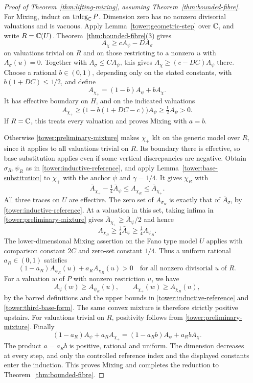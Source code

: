 \begin{proof}[Proof of Theorem~\ref{thm:lifting-mixing}, assuming
Theorem~\ref{thm:bounded-fibre}]
For Mixing, induct on $\operatorname{trdeg}_{\mathbb C}P$.
Dimension zero has no nonzero divisorial valuations and is
vacuous.  Apply Lemma~\ref{tower:geometric-step} over $\mathbb C$, and
write $R=\mathbb C(U)$.  Theorem~\ref{thm:bounded-fibre}(3) gives
\[
 A_\chi\ge cA_\psi-D A_\sigma
\]
on valuations trivial on $R$ and on those restricting to a
nonzero $u$ with $\bar A_\sigma(u)=0$.
Together with $A_\sigma\le C A_\psi$, this gives
$A_\chi\ge(c-DC)A_\psi$ there.
Choose a rational $b\in(0,1)$, depending only on the stated
constants, with $b(1+DC)\le1/2$, and define
\[
 A_{\chi_+}=(1-b)A_\psi+bA_\chi.
\]
It has effective boundary on $H$, and on the indicated valuations
\begin{equation}
\label{tower:preliminary-mixture}
 A_{\chi_+}\ge\bigl(1-b(1+DC-c)\bigr)A_\psi
 \ge\tfrac12 A_\psi>0.
\end{equation}
If $R=\mathbb C$, this treats every valuation and proves Mixing with
$a=b$.

Otherwise \eqref{tower:preliminary-mixture} makes $\chi_+$ klt
on the generic model over $R$, since it applies to all valuations
trivial on $R$.  Its boundary there is effective, so base
substitution applies even if some vertical discrepancies are
negative.  Obtain $\sigma_R,\psi_R$ as in
\eqref{tower:inductive-reference}, and apply
Lemma~\ref{tower:base-substitution} to $\chi_+$ with the anchor
$\psi$ and $\gamma=1/4$.  It gives $\chi_R$ with
\begin{equation}
\label{tower:third-base-form}
 \bar A_{\chi_+}-\tfrac14\bar A_\psi
 \le A_{\chi_R}\le\bar A_{\chi_+}.
\end{equation}
All three traces on $U$ are effective.  The zero set of
$A_{\sigma_R}$ is exactly that of $\bar A_\sigma$, by
\eqref{tower:inductive-reference}.  At a valuation in this set,
taking infima in \eqref{tower:preliminary-mixture} gives
$\bar A_{\chi_+}\ge\bar A_\psi/2$ and hence
\[
 A_{\chi_R}\ge\tfrac14\bar A_\psi
 \ge\tfrac14 A_{\psi_R}.
\]
The lower-dimensional Mixing assertion on the Fano type model
$U$ applies with comparison constant $2C$ and zero-set constant
$1/4$.  Thus a uniform rational $a_R\in(0,1)$ satisfies
\[
 (1-a_R)A_{\psi_R}(u)+a_R A_{\chi_R}(u)>0
 \quad\text{for all nonzero divisorial }u\text{ of }R.
\]
For a valuation $w$ of $P$ with nonzero restriction $u$, we have
\[
 A_\psi(w)\ge A_{\psi_R}(u),
 \qquad A_{\chi_+}(w)\ge A_{\chi_R}(u),
\]
by the barred definitions and the upper bounds in
\eqref{tower:inductive-reference} and
\eqref{tower:third-base-form}.  The same convex mixture is
therefore strictly positive upstairs.  For valuations trivial on
$R$, positivity follows from
\eqref{tower:preliminary-mixture}.
Finally
\[
 (1-a_R)A_\psi+a_RA_{\chi_+}
   =(1-a_Rb)A_\psi+a_Rb A_\chi.
\]
The product $a=a_Rb$ is positive, rational and uniform.
The dimension decreases at every step, and only the controlled
reference index and the displayed constants enter the induction.
This proves Mixing and completes the reduction to
Theorem~\ref{thm:bounded-fibre}.
\end{proof}
